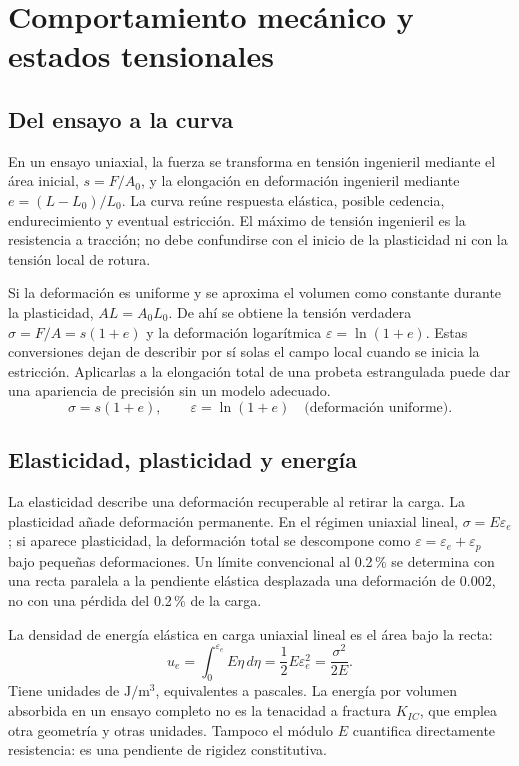 \chapter{Comportamiento mecánico y estados tensionales}\label{ch:02}
\section{Del ensayo a la curva}
En un ensayo uniaxial, la fuerza se transforma en tensión ingenieril mediante el área inicial, $s=F/A_0$, y la elongación en deformación ingenieril mediante $e=(L-L_0)/L_0$. La curva reúne respuesta elástica, posible cedencia, endurecimiento y eventual estricción. El máximo de tensión ingenieril es la resistencia a tracción; no debe confundirse con el inicio de la plasticidad ni con la tensión local de rotura.

Si la deformación es uniforme y se aproxima el volumen como constante durante la plasticidad, $AL=A_0L_0$. De ahí se obtiene la tensión verdadera $\sigma=F/A=s(1+e)$ y la deformación logarítmica $\varepsilon=\ln(1+e)$. Estas conversiones dejan de describir por sí solas el campo local cuando se inicia la estricción. Aplicarlas a la elongación total de una probeta estrangulada puede dar una apariencia de precisión sin un modelo adecuado.
\begin{equation}\sigma=s(1+e),\qquad\varepsilon=\ln(1+e)\quad\text{(deformación uniforme).}\label{eq:verdaderas}\end{equation}
\section{Elasticidad, plasticidad y energía}
La elasticidad describe una deformación recuperable al retirar la carga. La plasticidad añade deformación permanente. En el régimen uniaxial lineal, $\sigma=E\varepsilon_e$; si aparece plasticidad, la deformación total se descompone como $\varepsilon=\varepsilon_e+\varepsilon_p$ bajo pequeñas deformaciones. Un límite convencional al 0.2\,\% se determina con una recta paralela a la pendiente elástica desplazada una deformación de $0.002$, no con una pérdida del 0.2\,\% de la carga.

La densidad de energía elástica en carga uniaxial lineal es el área bajo la recta:
\begin{equation}u_e=\int_0^{\varepsilon_e}E\eta\,d\eta=\frac12 E\varepsilon_e^2=\frac{\sigma^2}{2E}.\label{eq:energiaelastica}\end{equation}
Tiene unidades de $\mathrm{J/m^3}$, equivalentes a pascales. La energía por volumen absorbida en un ensayo completo no es la tenacidad a fractura $K_{IC}$, que emplea otra geometría y otras unidades. Tampoco el módulo $E$ cuantifica directamente resistencia: es una pendiente de rigidez constitutiva.
